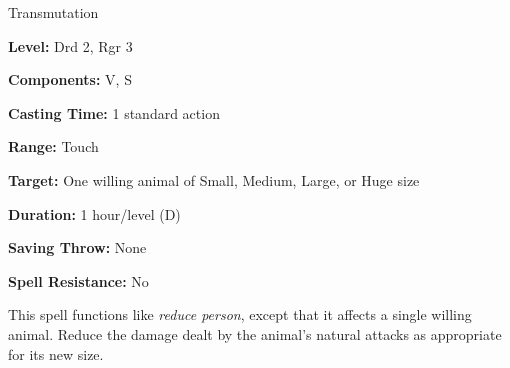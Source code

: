 
Transmutation

\textbf{Level:} Drd 2, Rgr 3

\textbf{Components:} V, S

\textbf{Casting Time:} 1 standard action

\textbf{Range:} Touch

\textbf{Target:} One willing animal of Small, Medium, Large, or Huge size

\textbf{Duration:} 1 hour/level (D)

\textbf{Saving Throw:} None

\textbf{Spell Resistance:} No

This spell functions like \textit{reduce person}, except that it affects a single 
willing animal. Reduce the damage dealt by the animal's natural attacks as appropriate 
for its new size.

